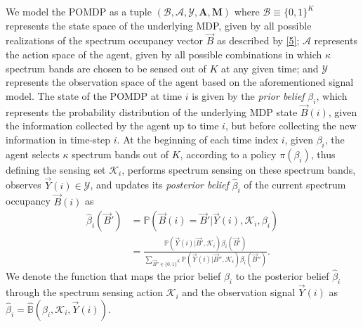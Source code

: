 \documentclass[10pt,twocolumn]{IEEEtran}
\begin{document}
We model the POMDP as a tuple $(\mathcal B,\mathcal{A},\mathcal{Y},\mathbf{A},\mathbf{M})$ where $\mathcal{B}\equiv\{0,1\}^K$ represents the state space of the underlying MDP, given by all possible realizations of the spectrum occupancy vector $\vec{B}$ as described by \eqref{5}; $\mathcal{A}$ represents the action space of the agent, given by all possible combinations in which $\kappa$ spectrum bands are chosen to be sensed out of $K$ at any given time; and $\mathcal{Y}$ represents the observation space of the agent based on the aforementioned signal model. The state of the POMDP at time $i$ is given by the \emph{prior belief} $\beta_i$, which represents the probability distribution of the underlying MDP state $\vec{B}(i)$, given the information collected by the agent up to time $i$, but before collecting the new information in time-step $i$. At the beginning of each time index $i$, given $\beta_i$, the agent selects $\kappa$ spectrum bands out of $K$, according to a policy $\pi(\beta_i)$, thus defining the sensing set $\mathcal K_i$, performs spectrum sensing  on these spectrum bands, observes $\vec{Y}(i){\in} \mathcal{Y}$, and updates its \emph{posterior belief} $\hat{\beta}_i$ of the current spectrum occupancy $\vec{B}(i)$ as 
\begin{align}\label{11}
\nonumber
\hat\beta_i(\vec{B}') &= \mathbb{P}(\vec{B}(i) = \vec{B}'|\vec{Y}(i), \mathcal K_i, \beta_i)\\&=
\frac{\mathbb{P}(\vec{Y}(i)|\vec{B}', \mathcal{K}_i) \beta_i(\vec{B}')}{
\sum_{\vec{B}'' {\in} \{0,1\}^K} \mathbb{P}(\vec{Y}(i)|\vec{B}'', \mathcal{K}_i) \beta_i(\vec{B}'')}.
\end{align}
We denote the function that maps the prior belief $\beta_i$ to the posterior belief $\hat\beta_i$ through the spectrum sensing action $\mathcal K_i$ and the observation signal $\vec{Y}(i)$ as $\hat\beta_i{=}\hat{\mathbb B}(\beta_i, \mathcal K_i, \vec{Y}(i))$.
\end{document}
